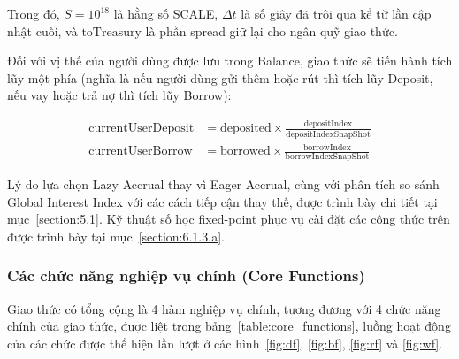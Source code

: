 \documentclass[../DoAn.tex]{subfiles}
\begin{document}
Trong đó, $S = 10^{18}$ là hằng số SCALE, $\Delta t$ là số giây đã trôi qua kể từ lần cập nhật cuối, và $\mathrm{toTreasury}$ là phần spread giữ lại cho ngân quỹ giao thức.


Đối với vị thế của người dùng được lưu trong Balance, giao thức sẽ tiến hành tích lũy một phía (nghĩa là nếu người dùng gửi thêm hoặc rút thì tích lũy Deposit, nếu vay hoặc trả nợ thì tích lũy Borrow):

\begin{align}
\mathrm{currentUserDeposit} &= \mathrm{deposited} \times \frac{\mathrm{depositIndex}}{\mathrm{depositIndexSnapShot}} \label{eq:current_deposit} \\
\mathrm{currentUserBorrow} &= \mathrm{borrowed} \times \frac{\mathrm{borrowIndex}}{\mathrm{borrowIndexSnapShot}} \label{eq:current_borrow}
\end{align}


Lý do lựa chọn Lazy Accrual thay vì Eager Accrual, cùng với phân tích so sánh Global Interest Index với các cách tiếp cận thay thế, được trình bày chi tiết tại mục~\ref{section:5.1}. Kỹ thuật số học fixed-point phục vụ cài đặt các công thức trên được trình bày tại mục~\ref{section:6.1.3.a}.

\subsubsection{Các chức năng nghiệp vụ chính (Core Functions)}


Giao thức có tổng cộng là 4 hàm nghiệp vụ chính, tương đương với 4 chức năng chính của giao thức, được liệt trong bảng~\ref{table:core_functions}, luồng hoạt động của các chức được thể hiện lần lượt ở các hình~\ref{fig:df}, \ref{fig:bf}, \ref{fig:rf} và \ref{fig:wf}.

\begin{table}[H]
\centering
{}
\caption{Các hàm nghiệp vụ chính}
\label{table:core_functions}
\end{table}
\end{document}
